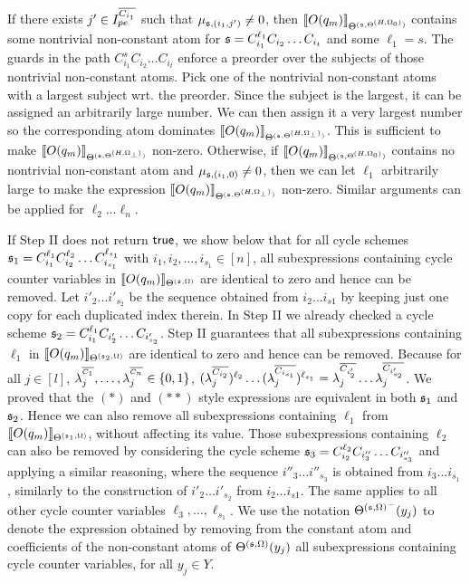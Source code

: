 If there exists $j' \in I^{\overline{C_{i_1}}}_{pe}$ such that
$\mu_{{\mathfrak{s} },(i_1,j')} \neq 0$, then $\llbracket O(q_m)\rrbracket_{\Theta^{({\mathfrak{s} },\Theta^{(H,\Omega_0)})}}$ contains some nontrivial non-constant atom for ${\mathfrak{s} }=C_{i_1}^{\ell_1} C_{i_2} \dots C_{i_t}$ and some $\ell_1=s$. The guards in the path $C_{i_1}^{s} C_{i_2} \dots C_{i_t}$ enforce a preorder over the subjects of those nontrivial non-constant atoms.
Pick one of the nontrivial non-constant atoms with a largest subject wrt. the preorder. Since the subject is the largest, it can be assigned an arbitrarily large number. We can then assign it a very largest number so the corresponding atom dominates $\llbracket O(q_m)\rrbracket_{\Theta^{({\mathfrak{s} },\Theta^{(H,\Omega_\bot)})}}$.  This is sufficient to make $\llbracket O(q_m)\rrbracket_{\Theta^{({\mathfrak{s} },\Theta^{(H,\Omega_\bot)})}}$ non-zero.
Otherwise, if $\llbracket O(q_m)\rrbracket_{\Theta^{({\mathfrak{s} },\Theta^{(H,\Omega_0)})}}$ contains no nontrivial non-constant atom and $\mu_{{\mathfrak{s} },(i_1,0)} \neq 0$, then we can let $\ell_1$ arbitrarily large to make the expression $\llbracket O(q_m)\rrbracket_{\Theta^{({\mathfrak{s} },\Theta^{(H,\Omega_\bot)})}}$ non-zero.
Similar arguments can be applied for $\ell_2\dots\ell_n$.

If Step II does not return $\mathsf{true}$, we show below that for all cycle schemes ${\mathfrak{s} }_1=C_{i_1}^{\ell_1} C_{i_2}^{\ell_2} \dots C_{i_{s_1}}^{\ell_{s_1}}$ with $i_1,i_2,\dots,i_{s_1} \in [n]$, all subexpressions containing cycle counter variables in $\llbracket O(q_m)\rrbracket_{\Theta^{({\mathfrak{s} },\Omega)}}$ are identical to zero and hence can be removed. Let ${i'_2} \dots {i'_{s_2}}$ be the sequence obtained from $i_2 \dots i_{s1}$ by keeping just one copy for each duplicated index therein.  
In Step II we already checked a cycle scheme ${\mathfrak{s} }_2=C_{i_1}^{\ell_1} C_{i'_2} \dots C_{i'_{s_2}}$. Step II guarantees that all subexpressions containing $\ell_1$ in 
$\llbracket O(q_m)\rrbracket_{\Theta^{({\mathfrak{s} }_2,\Omega)}}$ are identical to zero and hence can be removed.
Because for all $j\in[l]$, $\lambda^{^{\overline{C_1}}}_j, \dots, \lambda^{^{\overline{C_n}}}_j \in \{0,1\}$,   $(\lambda^{\overline{C_{i_2}}}_{j})^{\ell_2} \dots (\lambda^{\overline{C_{i_{s_1}}}}_{j})^{\ell_{s_1}} = \lambda^{\overline{C_{i'_2}}}_{j} \dots \lambda^{\overline{C_{i'_{s_2}}}}_{j}$. We proved that the $(\ast)$ and $(\ast\ast)$ style expressions are equivalent in both ${\mathfrak{s} }_1$ and ${\mathfrak{s} }_2$.
Hence we can also remove all subexpressions containing $\ell_1$ from  $\llbracket O(q_m)\rrbracket_{\Theta^{({\mathfrak{s} }_1,\Omega)}}$, without affecting its value.
Those subexpressions containing $\ell_2$ can also be removed by considering the cycle scheme ${\mathfrak{s} }_3=C_{i_2}^{\ell_2} C_{i''_3} \dots C_{i''_{s_3}}$ and applying a similar reasoning, where the sequence ${i''_3} \dots {i''_{s_3}}$ is obtained from ${i_3} \dots  i_{s_1}$, similarly to the construction of ${i'_2} \dots {i'_{s_2}}$ from $i_2 \dots i_{s1}$. The same applies to all other cycle counter variables $\ell_3,\dots,\ell_{s_1}$.
We use the notation ${\Theta^{({\mathfrak{s} },\Omega)}}^-(y_j)$ to denote the expression obtained by removing from the constant atom and coefficients of the non-constant atoms of $\Theta^{({\mathfrak{s} },\Omega)}(y_j)$ all subexpressions containing cycle counter variables, for all $y_j \in Y$. 

